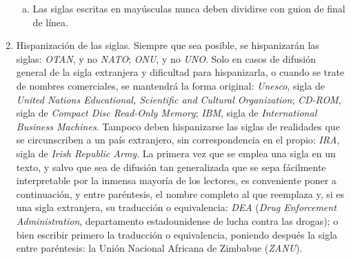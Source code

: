 \begin{enumerate}[1)]
\begin{enumerate}[a)]
		\item {Las siglas escritas en may\'usculas nunca deben dividirse con guion de final de l\'inea.}
	\end{enumerate}

	\item {Hispanizaci\'on de las siglas}. Siempre que sea posible, se hispanizar\'an las siglas: \textit{OTAN}, y no \textit{NATO}; \textit{ONU}, y no \textit{UNO}. Solo en casos de difusi\'on general de la sigla extranjera y dificultad para hispanizarla, o cuando se trate de nombres comerciales, se mantendr\'a la forma original: \textit{Unesco}, sigla de \textit{United Nations Educational, Scientific and Cultural Organization}; \textit{CD-ROM}, sigla de \textit{Compact Disc Read-Only Memory}; \textit{IBM}, sigla de \textit{International Business Machines}. Tampoco deben hispanizarse las siglas de realidades que se circunscriben a un pa\'is extranjero, sin correspondencia en el propio: \textit{IRA}, sigla de \textit{Irish Republic Army}. La primera vez que se emplea una sigla en un texto, y salvo que sea de difusi\'on tan generalizada que se sepa f\'acilmente interpretable por la inmensa mayor\'ia de los lectores, es conveniente poner a continuaci\'on, y entre par\'entesis, el nombre completo al que reemplaza y, si es una sigla extranjera, su traducci\'on o equivalencia: \textit{DEA} (\textit{Drug Enforcement Administration}, departamento estadounidense de lucha contra las drogas); o bien escribir primero la traducci\'on o equivalencia, poniendo despu\'es la sigla entre par\'entesis: la Uni\'on Nacional Africana de Zimbabue (\textit{ZANU}).
	
\end{enumerate}